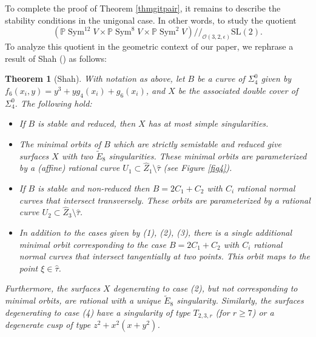 \documentclass{amsart}
\numberwithin{equation}{section}
\theoremstyle{plain}
\newtheorem{theorem}[equation]{Theorem}
\theoremstyle{remark}
\theoremstyle{definition}
\def\Sym{\operatorname{Sym}}
\newcommand{\bP}{\mathbb{P}}
\newcommand{\calO}{\mathcal{O}}
\newcommand{\SL}{\mathrm{SL}}
\newcommand{\Ee}{\widetilde{E}_8}
\newcommand{\gquot}{/\!\!/}
\begin{document}
 To complete the proof of Theorem \ref{thmgitpair}, it remains to describe the stability conditions in the unigonal case. In other words, to study the quotient 
 $$\left(\bP \Sym^{12}V\times\bP\Sym^{8}V\times \bP\Sym^2V\right)\gquot_{\calO(3,2,\epsilon)} \SL(2).$$
To analyze this quotient in the geometric context of our paper, we rephrase a result of Shah (\cite[Theorem 4.3]{shah}) as follows:
\begin{theorem}[Shah]\label{thmunigonal}
With notation as above, let $B$ be a curve of $\Sigma_4^0$ given by $f_6(x_i,y)=y^3+y g_4(x_i) + g_{6}(x_i)$, and $X$ be the associated double cover of $\Sigma_4^0$. The following hold: 
\begin{itemize}
\item[(1)] If $B$ is stable and reduced, then $X$ has at most simple singularities.
\item[(2)] The minimal orbits of $B$ which are strictly semistable and reduced give surfaces $X$ with two $\Ee$ singularities. These minimal orbits  
 are parameterized by a (affine) rational curve $U_1\subset \widehat Z_1\setminus \widehat\tau$ (see Figure \ref{fig4}). 
\item[(3)] If $B$ is stable and non-reduced then $B=2C_1+C_2$ with $C_i$ rational normal curves that intersect transversely. These orbits are parameterized by a rational curve $U_2\subset \widehat Z_3\setminus \widehat\tau$.
\item[(4)] In addition to the cases given by (1), (2), (3), there is a single additional minimal orbit corresponding to the case $B=2C_1+C_2$ with $C_i$ rational normal curves that intersect tangentially at two points. This orbit maps to the point $\xi\in \widehat \tau$. 
\end{itemize}
Furthermore, the surfaces $X$ degenerating to  case (2), but not corresponding to minimal orbits, are rational with a unique $\widetilde E_8$ singularity. Similarly, the surfaces degenerating to case (4) have a singularity of type $T_{2,3,r}$ (for $r\ge 7$) or a degenerate cusp of type $z^2+x^2(x+y^2)$. 
\end{theorem}
\end{document}
